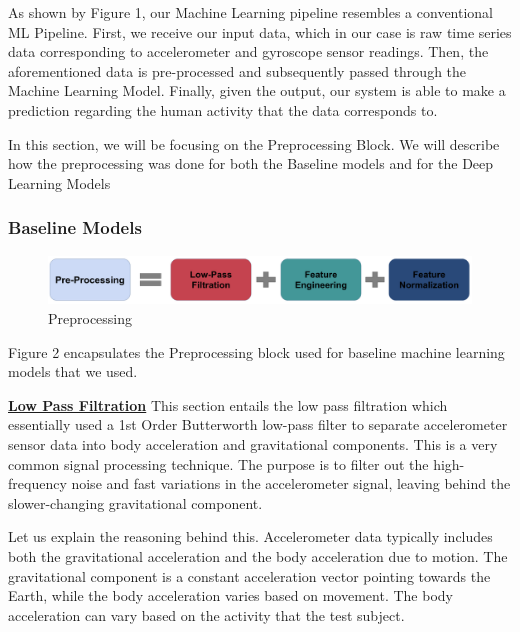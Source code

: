 \documentclass[conference]{IEEEtran}
\begin{document}
As shown by Figure 1, our Machine Learning pipeline resembles a conventional ML Pipeline. First, we receive our input data, which in our case is raw time series data corresponding to accelerometer and gyroscope sensor readings. Then, the aforementioned data is pre-processed and subsequently passed through the Machine Learning Model. Finally, given the output, our system is able to make a prediction regarding the human activity that the data corresponds to. 

In this section, we will be focusing on the Preprocessing Block. We will describe how the preprocessing was done for both the Baseline models and for the Deep Learning Models  

\subsubsection{Baseline Models}

\begin{figure}[h!]
	\includegraphics[width= 0.9 \linewidth]{Preprocessing.png}
	\centering
	\caption{Preprocessing}
	\label{Preprocessing.png}
\end{figure}

Figure 2 encapsulates the Preprocessing block used for baseline machine learning models that we used.

\textbf{\underline{Low Pass Filtration}} \newline 
This section entails the low pass filtration which essentially used a 1st Order Butterworth low-pass filter to separate accelerometer sensor data into body acceleration and gravitational components. This is a very common signal processing technique. The purpose is to filter out the high-frequency noise and fast variations in the accelerometer signal, leaving behind the slower-changing gravitational component. \newline 

Let us explain the reasoning behind this. Accelerometer data typically includes both the gravitational acceleration and the body acceleration due to motion. The gravitational component is a constant acceleration vector pointing towards the Earth, while the body acceleration varies based on movement. The body acceleration can vary based on the activity that the test subject. \newline 
\end{document}
